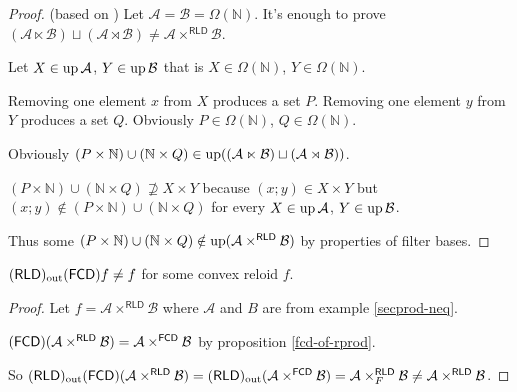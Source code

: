 \begin{proof}
(based on \cite{MO72638}) Let $\mathcal{A}=\mathcal{B}=\Omega(\mathbb{N})$.
It's enough to prove $(\mathcal{A}\ltimes\mathcal{B})\sqcup(\mathcal{A}\rtimes\mathcal{B})\neq\mathcal{A}\times^{\mathsf{RLD}}\mathcal{B}$.

Let $X\in\operatorname{up}\mathcal{A}$, $Y\in\operatorname{up}\mathcal{B}$ that is $X\in\Omega(\mathbb{N})$,
$Y\in\Omega(\mathbb{N})$.

Removing one element $x$ from $X$ produces a set $P$. Removing
one element $y$ from $Y$ produces a set $Q$. Obviously $P\in\Omega(\mathbb{N})$,
$Q\in\Omega(\mathbb{N})$.

Obviously $(P\times\mathbb{N})\cup(\mathbb{N}\times Q)\in\operatorname{up}((\mathcal{A}\ltimes\mathcal{B})\sqcup(\mathcal{A}\rtimes\mathcal{B}))$.

$(P\times\mathbb{N})\cup(\mathbb{N}\times Q)\nsupseteq X\times Y$
because $(x;y)\in X\times Y$ but $(x;y)\notin(P\times\mathbb{N})\cup(\mathbb{N}\times Q)$
for every $X\in\operatorname{up}\mathcal{A}$, $Y\in\operatorname{up}\mathcal{B}$.

Thus some $(P\times\mathbb{N})\cup(\mathbb{N}\times Q)\notin\operatorname{up}(\mathcal{A}\times^{\mathsf{RLD}}\mathcal{B})$
by properties of filter bases.\end{proof}
\begin{example}
$(\mathsf{RLD})_{\mathrm{out}}(\mathsf{FCD}) f\ne f$ for some convex reloid $f$.\end{example}
\begin{proof}
Let $f=\mathcal{A}\times^{\mathsf{RLD}}\mathcal{B}$ where $\mathcal{A}$
and $B$ are from example \ref{secprod-neq}.

$(\mathsf{FCD})(\mathcal{A}\times^{\mathsf{RLD}}\mathcal{B})=\mathcal{A}\times^{\mathsf{FCD}}\mathcal{B}$
by proposition \ref{fcd-of-rprod}.

So $(\mathsf{RLD})_{\mathrm{out}}(\mathsf{FCD})(\mathcal{A}\times^{\mathsf{RLD}}\mathcal{B})=(\mathsf{RLD})_{\mathrm{out}}(\mathcal{A}\times^{\mathsf{FCD}}\mathcal{B})=\mathcal{A}\times_{F}^{\mathsf{RLD}}\mathcal{B}\ne\mathcal{A}\times^{\mathsf{RLD}}\mathcal{B}$.\end{proof}

